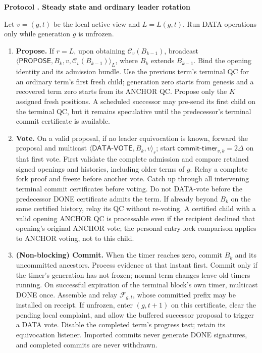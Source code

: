 \documentclass[11pt,a4paper]{article}
\newcommand{\RR}[1]{{\color{rrRed}#1}}
\newcommand{\QC}{\mathcal C}
\newcommand{\DC}{\mathcal F}
\newcommand{\tagg}[1]{\mathsf{#1}}
\newcounter{protocol}
\newenvironment{protocol}[2]{\refstepcounter{protocol}\label{#1}
\begin{mdframed}[nobreak=true,linewidth=.6pt,skipabove=8pt,skipbelow=8pt,
innertopmargin=7pt,innerbottommargin=7pt]\small
\textbf{Protocol \theprotocol. #2}\par\smallskip}{\end{mdframed}}
\begin{document}
\begin{protocol}{alg:steady}{Steady state and ordinary leader rotation}
Let $v=(g,t)$ be the local active view and $L=L(g,t)$.
\RR{Run DATA operations only while generation $g$ is unfrozen.}
\begin{enumerate}[label=\textbf{\arabic*)},itemsep=5pt]
\item \textbf{Propose.} If $r=L$, upon obtaining
$\QC_v(B_{k-1})$, broadcast
$\langle\tagg{PROPOSE},B_k,v,\QC_v(B_{k-1})\rangle_L$,
where $B_k$ extends $B_{k-1}$.
\RR{Bind the opening identity and its admission bundle. Use the previous
term's terminal QC for an ordinary term's first fresh child; generation
zero starts from genesis and a recovered term zero starts from its ANCHOR
QC. Propose only the $K$ assigned fresh positions. A scheduled successor
may pre-send its first child on the terminal QC, but it remains speculative
until the predecessor's terminal commit certificate is available.}
\item \textbf{Vote.} On a valid proposal, if no leader equivocation is known,
forward the proposal and multicast
$\langle\tagg{DATA\text{-}VOTE},B_k,v\rangle_r$; start
$\tagg{commit\text{-}timer}_{v,k}=2\Delta$ on that first vote.
\RR{First validate the complete admission and compare retained signed
openings and histories, including older terms of $g$. Relay a complete
fork proof and freeze before another vote. Catch up through all intervening
terminal commit certificates before voting. Do not DATA-vote before the
predecessor DONE certificate admits the term. If already beyond $B_k$
on the same certified history, relay its QC without re-voting. A certified
child with a valid opening ANCHOR QC is processable even if the recipient
declined that opening's original ANCHOR vote; the personal entry-lock
comparison applies to ANCHOR voting, not to this child.}
\item \textbf{(Non-blocking) Commit.} When the timer reaches zero, commit
$B_k$ and its uncommitted ancestors.
\RR{Process evidence at that instant first. Commit only if the timer's
generation has not frozen; normal term changes leave old timers running.
On successful expiration of the terminal block's own timer, multicast
DONE once. Assemble and relay $\DC_{g,t}$, whose committed prefix may be
installed on receipt. If unfrozen, enter $(g,t+1)$ on this certificate,
clear the pending local complaint, and allow the buffered successor
proposal to trigger a DATA vote. Disable the completed term's progress
test; retain its equivocation listener. Imported commits never generate
DONE signatures, and completed commits are never withdrawn.}
\end{enumerate}
\end{protocol}
\end{document}
